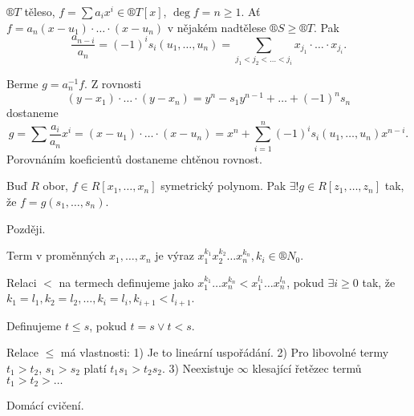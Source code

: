 \documentclass[12pt]{article}                   %
\begin{document}
    \begin{tvrzeni}
        $®T$ těleso, $f = \sum a_i x^i \in ®T[x]$, $\deg f = n ≥ 1$. Ať $f = a_n(x - u_1)·…·(x - u_n)$ v nějakém nadtělese $®S ≥ ®T$. Pak
        $$ \frac{a_{n-i}}{a_n} = (-1)^i s_i(u_1, …, u_n) = \sum_{j_1 < j_2 < … < j_i}x_{j_1}·…·x_{j_i}. $$

        \begin{dukazin}
            Berme $g = a^{-1}_n f$. Z rovnosti
            $$ (y - x_1)·…·(y - x_n) = y^n - s_1y^{n-1} + … + (-1)^ns_n $$
            dostaneme
            $$ g = \sum \frac{a_i}{a_n}x^i = (x - u_1)·…·(x - u_n) = x^n + \sum_{i=1}^n (-1)^i s_i(u_1, …, u_n)x^{n-i}. $$
            Porovnáním koeficientů dostaneme chtěnou rovnost.
        \end{dukazin}
    \end{tvrzeni}

    \begin{veta}
        Buď $R$ obor, $f \in R[x_1, …, x_n]$ symetrický polynom. Pak $\exists! g \in R[z_1, …, z_n]$ tak, že $f = g(s_1, …, s_n)$.

        \begin{dukazin}
            Později.
        \end{dukazin}
    \end{veta}

    \begin{definice}[Term]
        Term v proměnných $x_1, …, x_n$ je výraz $x_1^{k_1}x_2^{k_2}…x_n^{k_n}, k_i \in ®N_0$.
    \end{definice}

    \begin{definice}
        Relaci $<$ na termech definujeme jako $x_1^{k_1}…x_n^{k_n} < x_1^{l_1}…x_n^{l_n}$, pokud $\exists i ≥ 0$ tak, že $k_1 = l_1, k_2=l_2, …, k_i = l_i, k_{i + 1} < l_{i+1}$.

        Definujeme $t ≤ s$, pokud $t = s \lor t < s$.
    \end{definice}

    \begin{lemma}
        Relace $≤$ má vlastnosti: 1) Je to lineární uspořádání. 2) Pro libovolné termy $t_1 > t_2$, $s_1 > s_2$ platí $t_1s_1 > t_2s_2$. 3) Neexistuje $∞$ klesající řetězec termů $t_1 > t_2 > …$

        \begin{dukazin}
            Domácí cvičení.
        \end{dukazin}
    \end{lemma}
\end{document}

